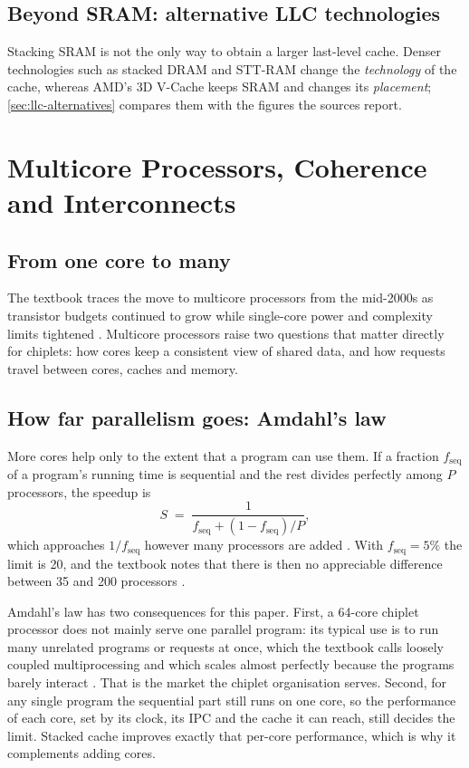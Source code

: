 \subsection{Beyond SRAM: alternative LLC technologies}
Stacking SRAM is not the only way to obtain a larger last-level cache. Denser technologies such as stacked DRAM \cite{mittalSurveyTechniquesArchitecting2016} and STT-RAM \cite{kimExploitingDataCompression2022} change the \emph{technology} of the cache, whereas AMD's 3D V-Cache keeps SRAM and changes its \emph{placement}; \cref{sec:llc-alternatives} compares them with the figures the sources report.

\section{Multicore Processors, Coherence and Interconnects}
\label{sec:multicore}

\subsection{From one core to many}
The textbook traces the move to multicore processors from the mid-2000s as transistor budgets continued to grow while single-core power and complexity limits tightened \cite[sec.~12.1]{sarangi2025basic}. Multicore processors raise two questions that matter directly for chiplets: how cores keep a consistent view of shared data, and how requests travel between cores, caches and memory.

\subsection{How far parallelism goes: Amdahl's law}
More cores help only to the extent that a program can use them. If a fraction $f_{\mathrm{seq}}$ of a program's running time is sequential and the rest divides perfectly among $P$ processors, the speedup is
\begin{equation}
  S \;=\; \frac{1}{f_{\mathrm{seq}} + (1 - f_{\mathrm{seq}})/P},
  \label{eq:amdahl}
\end{equation}
which approaches $1/f_{\mathrm{seq}}$ however many processors are added \cite[sec.~12.2.3]{sarangi2025basic}. With $f_{\mathrm{seq}} = 5\%$ the limit is 20, and the textbook notes that there is then no appreciable difference between 35 and 200 processors \cite[sec.~12.2.3]{sarangi2025basic}.

Amdahl's law has two consequences for this paper. First, a 64-core chiplet processor does not mainly serve one parallel program: its typical use is to run many unrelated programs or requests at once, which the textbook calls loosely coupled multiprocessing and which scales almost perfectly because the programs barely interact \cite[sec.~12.2.1]{sarangi2025basic}. That is the market the chiplet organisation serves. Second, for any single program the sequential part still runs on one core, so the performance of each core, set by its clock, its IPC and the cache it can reach, still decides the limit. Stacked cache improves exactly that per-core performance, which is why it complements adding cores.

